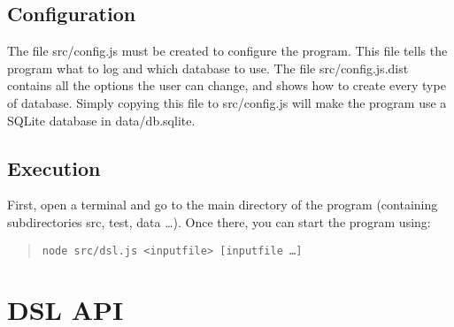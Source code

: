 \documentclass[a4paper,11pt]{article}
\begin{document}
\subsection{Configuration}
The file src/config.js must be created to configure the program. This file tells the program what to log and which database to use. The file src/config.js.dist contains all the options the user can change, and shows how to create every type of database. Simply copying this file to src/config.js will make the program use a SQLite database in data/db.sqlite.

\subsection{Execution}
First, open a terminal and go to the main directory of the program (containing subdirectories src, test, data …). Once there, you can start the program using:
\begin{quote}\begin{verbatim}
node src/dsl.js <inputfile> [inputfile …]
\end{verbatim}\end{quote}

\clearpage


\clearpage
\appendix
\section{DSL API}
\end{document}
